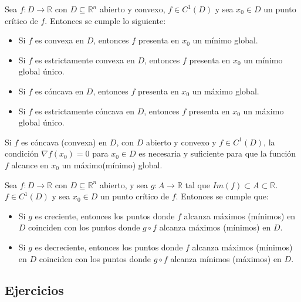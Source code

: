 \begin{Teo} Sea $f:D\to\mathbb{R}$ con $D\subseteq\mathbb{R}^n$ abierto y convexo, $f\in C^1(D)$ y sea $x_0\in D$ un punto cr\'itico de $f$. Entonces se cumple lo siguiente:

\begin{itemize}
\item[(i)] Si $f$ es convexa en $D$, entonces $f$ presenta en $x_0$ un m\'inimo global.
\item[(ii)] Si $f$ es estrictamente convexa en $D$, entonces $f$ presenta en $x_0$ un m\'inimo global \'unico.
\item[(iii)] Si $f$ es c\'oncava en $D$, entonces $f$ presenta en $x_0$ un m\'aximo global.
\item[(iv)] Si $f$ es estrictamente c\'oncava en $D$, entonces $f$ presenta en $x_0$ un m\'aximo global \'unico.
\end{itemize}
\end{Teo}

\begin{Obs} Si $f$ es c\'oncava (convexa) en $D$, con $D$ abierto y convexo y $f\in C^1(D)$, la condici\'on $\nabla f(x_0)=0$ para $x_0\in D$ es necesaria y suficiente para que la funci\'on $f$ alcance en $x_0$ un m\'aximo(m\'inimo) global.
\end{Obs}

\begin{Prop} Sea $f:D\to\mathbb{R}$ con $D\subseteq\mathbb{R}^n$ abierto, y sea $g:A\to\mathbb{R}$  tal que $Im\left(f\right)\subset A\subset\mathbb{R}$. $f\in C^1(D)$ y sea $x_0\in D$ un punto cr\'itico de $f$. Entonces se cumple que:

\begin{itemize}
\item[(i)] Si $g$ es creciente, entonces los puntos donde $f$ alcanza m\'aximos (m\'inimos) en $D$ coinciden con los puntos donde $g\circ f$ alcanza m\'aximos (m\'inimos) en $D$.
\item[(ii)] Si $g$ es decreciente, entonces los puntos donde $f$ alcanza m\'aximos (m\'inimos) en $D$ coinciden con los puntos donde $g\circ f$ alcanza m\'inimos (m\'aximos) en $D$.
\end{itemize}
\end{Prop}



\subsection{Ejercicios}


